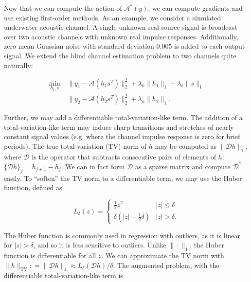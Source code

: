 \documentclass[journal]{IEEEtran}
\newcommand{\defeq}{\mathrel{\mathop:}=}
\begin{document}
Now that we can compute the action of $\mathcal{A}^\ast(y)$, we can compute gradients and use existing first-order methods.  As an example, we consider a simulated underwater acoustic channel.  A single unknown real source signal is broadcast over two acoustic channels with unknown real impulse responses.  Additionally, zero mean Gaussian noise with standard deviation $0.005$ is added to each output signal.  We extend the blind channel estimation problem to two channels quite naturally:

\begin{align*}
   \min_{h_i,s} ~&\|y_1 - \mathcal{A}(h_1s^T)\|_2^2 + \lambda_{h}\|h_1\|_1 + \lambda_s\|s\|_1\\
                 &\|y_2 - \mathcal{A}(h_2s^T)\|_2^2 + \lambda_{h}\|h_2\|_1.
\end{align*}

\noindent Further, we may add a differentiable total-variation-like term.  The addition of a total-variation-like term may induce sharp transitions and stretches of nearly constant signal values (e.g. where the channel impulse response is zero for brief periods).  The true total-variation (TV) norm of $h$ may be computed as $\|\mathcal{D}h\|_1$, where $\mathcal{D}$ is the operator that subtracts consecutive pairs of elements of $h$: $\{\mathcal{D}h\}_j = h_{j+1} - h_j$.  We can in fact form $\mathcal{D}$ as a sparse matrix and compute $\mathcal{D}^\ast$ easily.  To ``soften'' the TV norm to a differentiable term, we may use the Huber function, defined as

\[ L_\delta(z) = \left\{\begin{array}{ll} \frac{1}{2}z^2 & |z| \le \delta\\ \delta\left(|z| - \frac{1}{2}\delta\right) & |z| > \delta. \end{array}\right. \] 

\noindent The Huber function is commonly used in regression with outliers, as it is linear for $|z|>\delta$, and so it is less sensitive to outliers.  Unlike $\|\cdot\|_1$, the Huber function is differentiable for all $z$.  We can approximate the TV norm with ${\|h\|_\text{TV} \defeq\|\mathcal{D}h\|_1 \approx L_\delta(\mathcal{D}h)/\delta}$.  The augmented problem, with the differentiable total-variation-like term is
\end{document}
